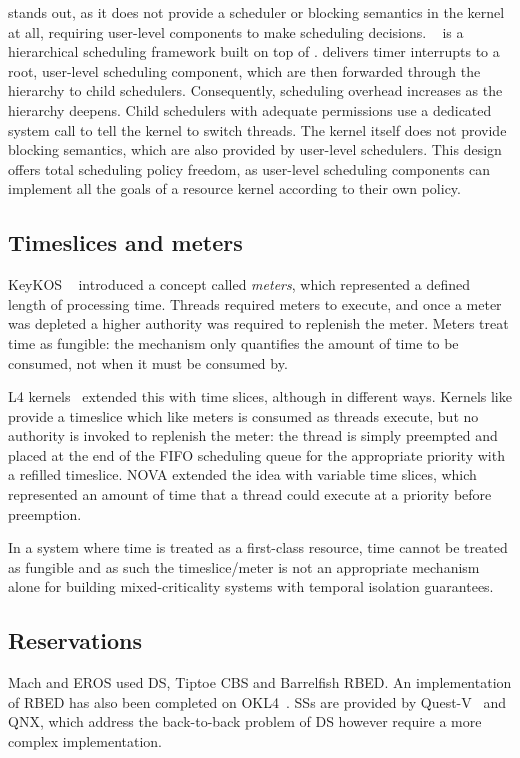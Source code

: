 \composite stands out, as it does not provide a scheduler or blocking semantics in the kernel at all,
requiring user-level
components to make scheduling decisions. \hires~\citep{Parmer_West_11} is a hierarchical scheduling framework built on top
of \composite. 
 \hires delivers timer interrupts to a root, user-level scheduling component, which are then forwarded
through the hierarchy to child schedulers.  Consequently, scheduling overhead increases as the
hierarchy deepens.  Child schedulers with adequate permissions use a dedicated system call to tell
the kernel to switch threads.  The kernel itself does not provide blocking semantics, which are also
provided by user-level schedulers.  This design offers total scheduling policy freedom, as
user-level scheduling components can implement all the goals of a resource kernel according to
their own policy.


\subsection{Timeslices and meters}

KeyKOS ~\citep{Bomberger_FFHLS_92} introduced a concept called \emph{meters}, which represented a
defined length of processing time. Threads required meters to execute, and once a meter was depleted
a higher authority was required to replenish the meter. Meters treat time as fungible: the mechanism
only quantifies the amount of time to be consumed, not when it must be consumed by.

L4 kernels~\citep{Elphinstone_Heiser_13} extended this with time slices, although in different ways.
Kernels like \selfour provide a timeslice which like meters is consumed as threads execute, but no
authority is invoked to replenish the meter: the thread is simply preempted and placed at the end of
the \gls{FIFO} scheduling queue for the appropriate priority with a refilled timeslice. NOVA
extended the idea with variable time slices, which represented an amount of time that a thread could
execute at a priority before preemption.

In a system where time is treated as a first-class resource, time cannot be treated as fungible and
as such the timeslice/meter is not an appropriate mechanism alone for building mixed-criticality
systems with temporal isolation guarantees.

\subsection{Reservations}
Mach and EROS used \gls{DS}, Tiptoe \gls{CBS} and Barrelfish \gls{RBED}. 
An implementation of RBED has also been completed on OKL4~\citep{Petters_LHE_09}.
\Glspl{SS} are provided by Quest-V~\citep{Li_WCM_14} and QNX, which address the back-to-back
problem of \gls{DS} however require a more complex implementation.

